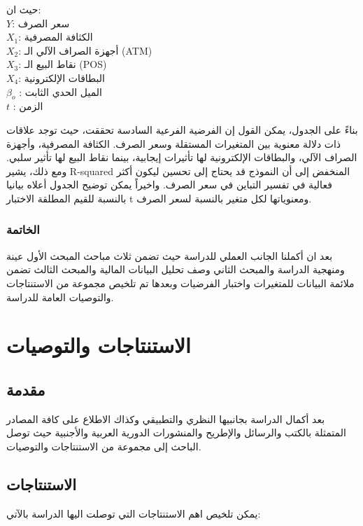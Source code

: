 \documentclass[10pt,a4paper]{report}
\begin{document}
\begin{doublespacing}
حيث ان:\\
$Y$:  سعر الصرف\\
$X_1$: الكثافة المصرفية \\
$X_2$:  أجهزة الصراف الآلي الـ (ATM)\\
$X_3$: نقاط البيع الـ (POS)\\
$X_4$: البطاقات الإلكترونية\\
$\beta_o$ : الميل الحدي الثابت\\
$t$ : الزمن

بناءً على الجدول، يمكن القول إن الفرضية الفرعية السادسة تحققت، حيث توجد علاقات ذات دلالة معنوية بين المتغيرات المستقلة وسعر الصرف. الكثافة المصرفية، وأجهزة الصراف الآلي، والبطاقات الإلكترونية لها تأثيرات إيجابية، بينما نقاط البيع لها تأثير سلبي. ومع ذلك، يشير R-squared المنخفض إلى أن النموذج قد يحتاج إلى تحسين ليكون أكثر فعالية في تفسير التباين في سعر الصرف. واخيراً يمكن توضيح الجدول أعلاه بيانيا بالنسبة للقيم المطلقة الاختبار t ومعنوياتها لكل متغير بالنسبة لسعر الصرف.

\subsection*{الخاتمة}
بعد ان أكملنا الجانب العملي للدراسة حيث تضمن ثلاث مباحث المبحث الأول عينة ومنهجية الدراسة والمبحث الثاني وصف تحليل البيانات المالية والمبحث الثالث تضمن ملائمة البيانات للمتغيرات واختبار الفرضيات وبعدها تم تلخيص مجموعة من الاستنتاجات والتوصيات العامة للدراسة. 
\chapter{الاستنتاجات والتوصيات}
\thispagestyle{empty}
\clearpage
\section*{مقدمة}
بعد أكمال الدراسة بجانبيها النظري والتطبيقي وكذاك الاطلاع على كافة المصادر المتمثلة بالكتب والرسائل والإطريح والمنشورات الدورية العربية والأجنبية حيث توصل الباحث إلى مجموعة من الاستنتاجات والتوصيات.
\section{الاستنتاجات}
يمكن تلخيص اهم الاستنتاجات التي توصلت اليها الدراسة بالآتي:


\end{doublespacing}
\end{document}
